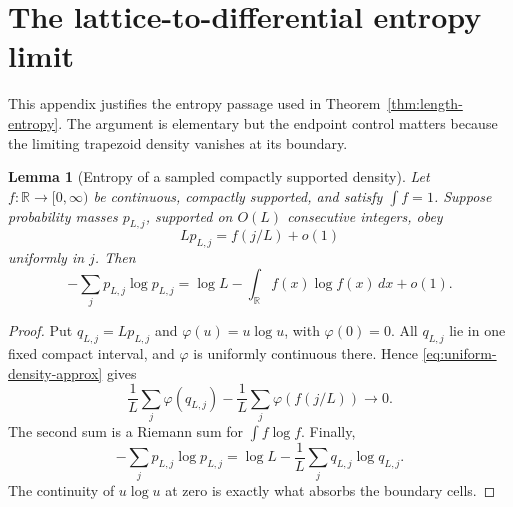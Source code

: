 \documentclass[11pt,oneside]{article}
\newtheorem{lemma}[theorem]{Lemma}
\theoremstyle{definition}
\theoremstyle{remark}
\newcommand{\R}{\mathbb{R}}
\begin{document}
\appendix

\section{The lattice-to-differential entropy limit}\label{app:local-limit}

This appendix justifies the entropy passage used in Theorem~\ref{thm:length-entropy}.  The argument is elementary but the endpoint control matters because the limiting trapezoid density vanishes at its boundary.

\begin{lemma}[Entropy of a sampled compactly supported density]\label{lem:sampled-density}
Let \(f:\R\to[0,\infty)\) be continuous, compactly supported, and satisfy \(\int f=1\).  Suppose probability masses \(p_{L,j}\), supported on \(O(L)\) consecutive integers, obey
\begin{equation}\label{eq:uniform-density-approx}
 Lp_{L,j}=f(j/L)+o(1)
\end{equation}
uniformly in \(j\).  Then
\begin{equation}\label{eq:sampled-entropy}
 -\sum_jp_{L,j}\log p_{L,j}
 =\log L-\int_{\R}f(x)\log f(x)\,dx+o(1).
\end{equation}
\end{lemma}

\begin{proof}
Put \(q_{L,j}=Lp_{L,j}\) and \(\varphi(u)=u\log u\), with \(\varphi(0)=0\).  All \(q_{L,j}\) lie in one fixed compact interval, and \(\varphi\) is uniformly continuous there.  Hence \eqref{eq:uniform-density-approx} gives
\[
 \frac1L\sum_j\varphi(q_{L,j})
 -\frac1L\sum_j\varphi(f(j/L))\longrightarrow0.
\]
The second sum is a Riemann sum for \(\int f\log f\).  Finally,
\[
 -\sum_jp_{L,j}\log p_{L,j}
 =\log L-\frac1L\sum_jq_{L,j}\log q_{L,j}.
\]
The continuity of \(u\log u\) at zero is exactly what absorbs the boundary cells.
\end{proof}
\end{document}
